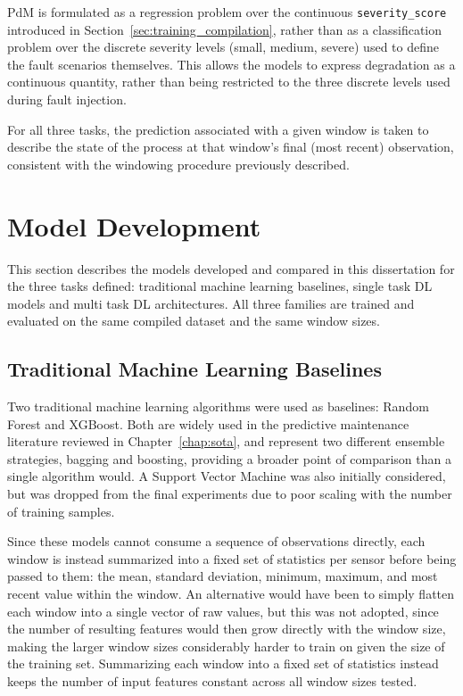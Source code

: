 PdM is formulated as a regression problem over the continuous \texttt{severity\_score} 
introduced in Section~\ref{sec:training_compilation}, rather than as a classification problem over the 
discrete severity levels (small, medium, severe) used to define the fault scenarios themselves. This 
allows the models to express degradation as a continuous quantity, rather than being restricted to the 
three discrete levels used during fault injection.

For all three tasks, the prediction associated with a given window is taken to describe the state of the 
process at that window's final (most recent) observation, consistent with the windowing procedure 
previously described.

\section{Model Development} \label{sec:model_development}

This section describes the models developed and compared in this dissertation for the three tasks 
defined: traditional machine learning baselines, single task DL models and multi task DL architectures. 
All three families are trained and evaluated 
on the same compiled dataset and the same window sizes.

\subsection{Traditional Machine Learning Baselines} \label{sec:ml_baselines}

Two traditional machine learning algorithms were used as baselines: Random Forest and XGBoost. Both are 
widely used in the predictive maintenance literature reviewed in Chapter~\ref{chap:sota}, and represent 
two different ensemble strategies, bagging and boosting, providing a broader point of comparison than a 
single algorithm would. A Support Vector Machine was also initially considered, but was dropped from the 
final experiments due to poor scaling with the number of training samples.

Since these models cannot consume a sequence of observations directly, each window is instead summarized 
into a fixed set of statistics per sensor before being passed to them: the mean, standard deviation, 
minimum, maximum, and most recent value within the window. An alternative would have been to simply 
flatten each window into a single vector of raw values, but this was not adopted, since the number of 
resulting features would then grow directly with the window size, making the larger window sizes 
considerably harder to train on given the size of the training set. Summarizing each window into a fixed 
set of statistics instead keeps the number of input features constant across all window sizes tested.

